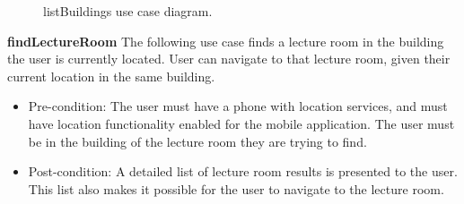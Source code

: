 \documentclass[12pt,a4paper]{article}
\begin{document}

			\begin{figure}[ht!]
				\caption \newline listBuildings use case diagram.
			\end{figure}

			\textbf{findLectureRoom}
			The following use case finds a lecture room in the building the user is currently located. User can navigate to 				that lecture room, given their current location in the same building.

			\begin{itemize}
			\item Pre-condition: The user must have a phone with location services, and must have location functionality 						  enabled for the mobile application. The user must be in the building of the lecture room they are trying 						  to find.
			\item Post-condition: A detailed list of lecture room results is presented to the user. This list also makes it 					  possible for the user to navigate to the lecture room.
			\end{itemize}


\end{document}
\end{itemize}
\end{document}
